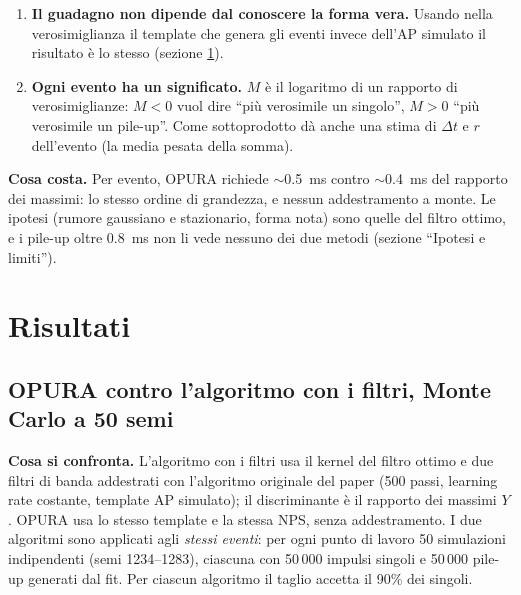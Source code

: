 \documentclass[11pt,a4paper]{article}
\newcommand{\dt}{\Delta t}
\begin{document}
\begin{enumerate}
    scende dall'1.9\% di $Y$ allo 0.3\%. È da qui che viene il guadagno.
  \item \textbf{Il guadagno non dipende dal conoscere la forma vera.} Usando nella verosimiglianza il
    template che genera gli eventi invece dell'AP simulato il risultato è lo stesso (sezione
    \ref{sec:risultati}).
  \item \textbf{Ogni evento ha un significato.} $M$ è il logaritmo di un rapporto di verosimiglianze:
    $M<0$ vuol dire ``più verosimile un singolo'', $M>0$ ``più verosimile un pile-up''. Come
    sottoprodotto dà anche una stima di $\dt$ e $r$ dell'evento (la media pesata della somma).
\end{enumerate}

\noindent\textbf{Cosa costa.} Per evento, OPURA richiede $\sim$0.5~ms contro $\sim$0.4~ms del
rapporto dei massimi: lo stesso ordine di grandezza, e nessun addestramento a monte. Le ipotesi
(rumore gaussiano e stazionario, forma nota) sono quelle del filtro ottimo, e i pile-up oltre
0.8~ms non li vede nessuno dei due metodi (sezione ``Ipotesi e limiti'').

\section{Risultati}
\label{sec:risultati}
\subsection{OPURA contro l'algoritmo con i filtri, Monte Carlo a 50 semi}
\textbf{Cosa si confronta.} L'algoritmo con i filtri usa il kernel del filtro ottimo e due filtri di
banda addestrati con l'algoritmo originale del paper (500 passi, learning rate costante, template
AP simulato); il discriminante è il rapporto dei massimi $Y$. OPURA usa lo stesso template e la
stessa NPS, senza addestramento. I due algoritmi sono applicati agli \emph{stessi eventi}: per ogni
punto di lavoro 50 simulazioni indipendenti (semi 1234--1283), ciascuna con 50\,000 impulsi singoli
e 50\,000 pile-up generati dal fit. Per ciascun algoritmo il taglio accetta il 90\% dei singoli.
\end{document}
